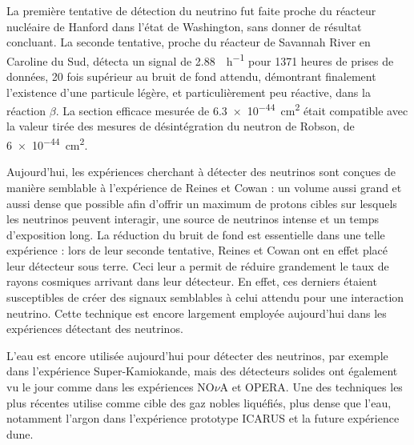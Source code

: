 		    La première tentative de détection du neutrino fut faite proche du réacteur nucléaire de Hanford dans l'état de Washington, sans donner de résultat concluant. La seconde tentative, proche du réacteur de Savannah River en Caroline du Sud, détecta un signal de \SI{2.88}{\per\hour}\cite{Cowan1956} pour 1371 heures de prises de données, 20 fois supérieur au bruit de fond attendu, démontrant finalement l'existence d'une particule légère, et particulièrement peu réactive, dans la réaction $\beta$. La section efficace mesurée de  \SI{6.3e-44}{\centi\meter\squared} était compatible avec la valeur tirée des mesures de désintégration du neutron de Robson\cite{Robson1951}, de \SI{6e-44}{\centi\meter\squared}.
		    
		    Aujourd'hui, les expériences cherchant à détecter des neutrinos sont conçues de manière semblable à l'expérience de Reines et Cowan : un volume aussi grand et aussi dense que possible afin d'offrir un maximum de protons cibles sur lesquels les neutrinos  peuvent interagir, une source de neutrinos intense et un temps d'exposition long. La réduction du bruit de fond est essentielle dans une telle expérience : lors de leur seconde tentative, Reines et Cowan ont en effet placé leur détecteur sous terre. Ceci leur a permit de réduire grandement le taux de rayons cosmiques arrivant dans leur détecteur. En effet, ces derniers étaient susceptibles de créer des signaux semblables à celui attendu pour une interaction neutrino. Cette technique est encore largement employée aujourd'hui dans les expériences détectant des neutrinos.
		    
		    L'eau est encore utilisée aujourd'hui pour détecter des neutrinos, par exemple dans l'expérience Super-Kamiokande\cite{Fukuda1998}, mais des détecteurs solides ont également vu le jour comme dans les expériences NO$\nu$A\cite{Adamson2016} et OPERA\cite{Agafonova2018}. Une des techniques les plus récentes utilise comme cible des gaz nobles liquéfiés, plus dense que l'eau, notamment l'argon dans l'expérience prototype ICARUS\cite{Amerio2004} et la future expérience \gls{dune}\cite{Acciarri2016a}. 
		    
